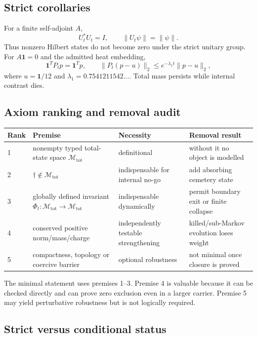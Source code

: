 \documentclass[11pt,a4paper]{article}
\newcommand{\Mtot}{\mathcal M_{\mathrm{tot}}}
\newcommand{\nothingstate}{\dagger}
\begin{document}
\subsection{Strict corollaries}

For a finite self-adjoint $A$,
\[
 U_t^*U_t=I,
 \qquad \|U_t\psi\|=\|\psi\|.
\]
Thus nonzero Hilbert states do not become zero under the strict unitary group.
For $A\mathbf1=0$ and the admitted heat embedding,
\[
 \mathbf1^TP_tp=\mathbf1^Tp,
 \qquad
 \|P_t(p-u)\|_2\le e^{-\lambda_1t}\|p-u\|_2,
\]
where $u=\mathbf1/12$ and $\lambda_1=0.7541211542\ldots$.  Total mass
persists while internal contrast dies.

\subsection{Axiom ranking and removal audit}

\begin{longtable}{@{}p{}p{}p{}p{}@{}}
\toprule
Rank & Premise & Necessity & Removal result \\
\midrule\endhead
1 & nonempty typed total-state space $\Mtot$ & definitional & without it no object is modelled \\
2 & $\nothingstate\notin\Mtot$ & indispensable for internal no-go & add absorbing cemetery state \\
3 & globally defined invariant $\Phi_t:\Mtot\to\Mtot$ & indispensable dynamically & permit boundary exit or finite collapse \\
4 & conserved positive norm/mass/charge & independently testable strengthening & killed/sub-Markov evolution loses weight \\
5 & compactness, topology or coercive barrier & optional robustness & not minimal once closure is proved \\
\bottomrule
\end{longtable}

The minimal statement uses premises 1--3.  Premise 4 is valuable because it
can be checked directly and can prove zero exclusion even in a larger carrier.
Premise 5 may yield perturbative robustness but is not logically required.

\subsection{Strict versus conditional status}
\end{document}

